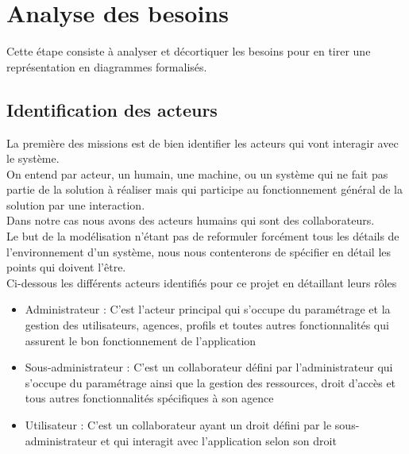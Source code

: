 \section{Analyse des besoins}
Cette étape consiste à analyser et décortiquer les besoins pour en tirer une représentation en diagrammes formalisés.

\subsection{Identification des acteurs}
La première des missions est de bien identifier les acteurs qui vont interagir avec le système.\\
On entend par acteur, un humain, une machine, ou un système qui ne fait pas partie de la solution à réaliser mais qui participe au fonctionnement général de la solution par une interaction.\\
Dans notre cas nous avons des acteurs humains qui sont des collaborateurs.\\
Le but de la modélisation n'étant pas de reformuler forcément tous les détails de l'environnement d'un système, nous nous contenterons de spécifier en détail les points qui doivent l'être.\\
Ci-dessous les différents acteurs identifiés pour ce projet en détaillant leurs rôles

\begin{itemize}[label=\textbullet]
\item Administrateur : C'est l'acteur principal qui s'occupe du paramétrage et la gestion des utilisateurs, agences, profils et toutes autres fonctionnalités qui assurent le bon fonctionnement de l'application
\item Sous-administrateur : C'est un collaborateur défini par l'administrateur qui s'occupe du paramétrage ainsi que la gestion des ressources, droit d'accès et tous autres fonctionnalités spécifiques à son agence
\item Utilisateur : C'est un collaborateur ayant un droit défini par le sous-administrateur et qui interagit avec l'application selon son droit
\end{itemize}

